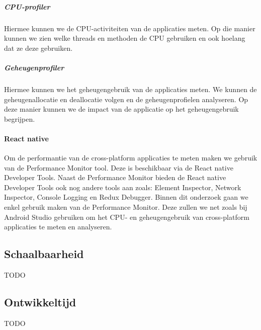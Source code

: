 \subparagraph{CPU-profiler}
Hiermee kunnen we de CPU-activiteiten van de applicaties meten. Op die manier kunnen we zien welke threads en methoden de CPU gebruiken en ook hoelang dat ze deze gebruiken.

\subparagraph{Geheugenprofiler}
Hiermee kunnen we het geheugengebruik van de applicaties meten. We kunnen de geheugenallocatie en deallocatie volgen en de geheugenprofielen analyseren. 
Op deze manier kunnen we de impact van de applicatie op het geheugengebruik begrijpen.

\paragraph{React native}
Om de performantie van de cross-platform applicaties te meten maken we gebruik van de Performance Monitor tool. 
Deze is beschikbaar via de React native Developer Tools. Naast de Performance Monitor bieden de React native Developer Tools ook nog andere tools aan zoals: 
Element Inspector, Network Inspector, Console Logging en Redux Debugger. Binnen dit onderzoek gaan we enkel gebruik maken van de Performance Monitor. 
Deze zullen we net zoals bij Android Studio gebruiken om het CPU- en geheugengebruik van cross-platform applicaties te meten en analyseren.

\subsection{Schaalbaarheid}
TODO

\subsection{Ontwikkeltijd}
TODO
